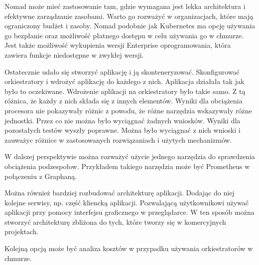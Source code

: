 \documentclass{iiuwb}
\begin{document}
Nomad może mieć zastosowanie tam, gdzie wymagana jest lekka 
architektura i efektywne zarządzanie zasobami. Warto go rozważyć 
w organizacjach, które mają ograniczony budżet i zasoby. Nomad 
podobnie jak Kubernetes ma opcję używania go bezpłanie oraz 
możliwość płatnego dostępu w celu używania go w chmurze. Jest 
także możliwość wykupienia wersji Enterprise oprogramowania, która 
zawiera funkcje niedostępne w zwykłej wersji.
\newline


Ostatecznie udało się stworzyć aplikację i ją skonteneryzować. 
Skonfigurować orkiestratory i wdrożyć aplikację do każdego z nich. 
Aplikacja działała tak jak było to oczekiwane. Wdrożenie aplikacji 
na orkiestratory było takie samo. Z tą różnica, że każdy z nich 
składa się z innych elementów. 
Wyniki dla obciążenia procesora nie pokazywały różnic z powodu, że 
różne narzędzia wskazywały różne jednostki. Przez co nie można było 
wyciągnać żadnych wniosków. Wyniki dla pozostałych testów wyszły 
poprawne. Można było wyciągnać z nich wnioski i zauważyc różnice 
w zastosowanych rozwiązaniach i użytych mechanizmów.
\newline


W dalszej perspektywie można rozważyć użycie jednego narzędzia do 
sprawdzenia obciążenia podzespołow. Przykładem takiego narzędzia 
może być Prometheus w połączeniu z Graphaną. 

Można również bardziej rozbudować architekturę aplikacji. Dodając do niej kolejne serwisy, 
np. część kliencką aplikacji. Pozwalającą użytkownikowi używać 
aplikacji przy pomocy interfejsu graficznego w przeglądarce. W ten 
sposób można stworzyć architekturę zbliżona do tych, które tworzy 
się w komercyjnych projektach.

Kolejną opcją może być analiza kosztów w przypadku używania 
orkiestratorów w chmurze.


\cleardoublepage
{}



\listoffigures

\listoftables
\end{document}
